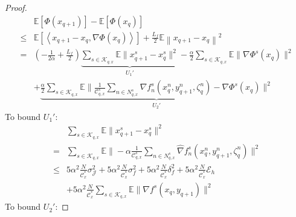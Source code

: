 \documentclass[lettersize,journal]{IEEEtran}
\begin{document}
\begin{proof}
\begin{align*}
    & \mathbb{E}\left[\Phi(x_{q+1})\right]-\mathbb{E}\left[\Phi(x_q)\right] \nonumber\\
    \leq & \mathbb{E}\left[\left\langle x_{q+1} - x_q, \nabla \Phi(x_q) \right\rangle\right] +\frac{L_f}{2} \mathbb{E}\left\|x_{q+1} -x_q\right\|^2\\
    =&(-\frac{1}{2\alpha}+\frac{L_f}{2})\underbrace{\sum_{s\in \mathcal{K}_{q,x}}\mathbb{E}\|x_{q+1}^s -x_q^s\|^2}_{U_1'}-\frac{\alpha}{2}\sum_{s\in \mathcal{K}_{q,x}}\mathbb{E}\|\nabla \Phi^s(x_{q})\|^2\\
    &+\underbrace{\frac{\alpha}{2}\sum_{s\in \mathcal{K}_{q,x}}\mathbb{E}\|\frac{1}{\mathcal{C}^{s}_{q,x}}\sum_{n\in N^{s}_{q,x}}\nabla f^s_n(x_{q}^n,y_{q+1}^n,\zeta_q^n)-\nabla \Phi^s(x_{q})\|^2}_{U_2'} 
\end{align*}
To bound $U_1'$:
\begin{align*}
    &\sum_{s\in \mathcal{K}_{q,x}}\mathbb{E}\|x_{q+1}^s -x_q^s\|^2\\
    =&\sum_{s\in \mathcal{K}_{q,x}}\mathbb{E}\|-\alpha\frac{1}{\mathcal{C}^{s}_{q,x}}\sum_{n\in N_{q,x}^{s}}\hat{\nabla} f^s_n(x_{q}^n,y_{q+1}^n,\zeta_q^n)\|^2\\
    \leq&5\alpha^2\frac{N}{\mathcal{C}_x^*}\sigma_{\mathcal{J}}^2+5\alpha^2\frac{N}{\mathcal{C}_x^*}\sigma_f^2+5\alpha^2\frac{N}{\mathcal{C}_x^*}\delta^2_f+5\alpha^2\frac{N}{\mathcal{C}_x^*}\mathcal{E}_h\\&+5\alpha^2\frac{N}{\mathcal{C}_x^*}\sum_{s\in \mathcal{K}_{q,x}}\mathbb{E}\|\nabla f^s(x_{q},y_{q+1})\|^2
\end{align*}
To bound $U_2'$:


\end{proof}
\end{document}
